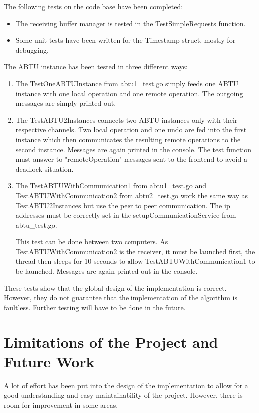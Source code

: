 \documentclass[11pt, a4paper, oneside, openright]{article} %
\begin{document}
The following tests on the code base have been completed:
\begin{itemize}
	\item The receiving buffer manager is tested in the TestSimpleRequests function.
	\item Some unit tests have been written for the Timestamp struct, mostly for debugging.
\end{itemize}

The ABTU instance has been tested in three different ways:
\begin{enumerate}
	\item The TestOneABTUInstance from abtu1\_test.go simply feeds one ABTU instance with one local operation and one remote operation. The outgoing messages are simply printed out.
	\item The TestABTU2Instances connects two ABTU instances only with their respective channels. Two local operation and one undo are fed into the first instance which then communicates the resulting remote operations to the second instance. Messages are again printed in the console. The test function must answer to "remoteOperation" messages sent to the frontend to avoid a deadlock situation.
	\item The TestABTUWithCommunication1 from abtu1\_test.go and TestABTUWithCommunication2 from abtu2\_test.go work the same way as TestABTU2Instances but use the peer to peer communication. The ip addresses must be correctly set in the setupCommunicationService from abtu\_test.go.

This test can be done between two computers. As TestABTUWithCommunication2 is the receiver, it must be launched first, the thread then sleeps for 10 seconds to allow TestABTUWithCommunication1 to be launched. Messages are again printed out in the console.
\end{enumerate}

These tests show that the global design of the implementation is correct. However, they do not guarantee that the implementation of the algorithm is faultless. Further testing will have to be done in the future.

\section{Limitations of the Project and Future Work}

A lot of effort has been put into the design of the implementation to allow for a good understanding and easy maintainability of the project. However, there is room for improvement in some areas.
\end{document}
